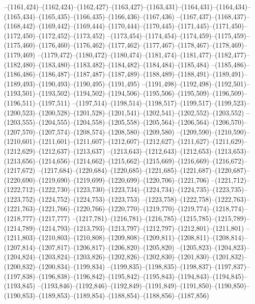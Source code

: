 --(1161,424)--(1162,424)--(1162,427)--(1163,427)--(1163,431)--(1164,431)--(1164,434)--(1165,434)--(1165,435)--(1166,435)--(1166,436)--(1167,436)
--(1167,437)--(1168,437)--(1168,442)--(1169,442)--(1169,444)--(1170,444)--(1170,445)--(1171,445)--(1171,450)--(1172,450)--(1172,452)--(1173,452)
--(1173,454)--(1174,454)--(1174,459)--(1175,459)--(1175,460)--(1176,460)--(1176,462)--(1177,462)--(1177,467)--(1178,467)--(1178,469)--(1179,469)
--(1179,472)--(1180,472)--(1180,474)--(1181,474)--(1181,477)--(1182,477)--(1182,480)--(1183,480)--(1183,482)--(1184,482)--(1184,484)--(1185,484)
--(1185,486)--(1186,486)--(1186,487)--(1187,487)--(1187,489)--(1188,489)--(1188,491)--(1189,491)--(1189,493)--(1190,493)--(1190,495)--(1191,495)
--(1191,498)--(1192,498)--(1192,501)--(1193,501)--(1193,502)--(1194,502)--(1194,506)--(1195,506)--(1195,509)--(1196,509)--(1196,511)--(1197,511)
--(1197,514)--(1198,514)--(1198,517)--(1199,517)--(1199,523)--(1200,523)--(1200,528)--(1201,528)--(1201,541)--(1202,541)--(1202,552)--(1203,552)
--(1203,555)--(1204,555)--(1204,558)--(1205,558)--(1205,564)--(1206,564)--(1206,570)--(1207,570)--(1207,574)--(1208,574)--(1208,580)--(1209,580)
--(1209,590)--(1210,590)--(1210,601)--(1211,601)--(1211,607)--(1212,607)--(1212,627)--(1211,627)--(1211,629)--(1212,629)--(1212,637)--(1213,637)
--(1213,643)--(1212,643)--(1212,653)--(1213,653)--(1213,656)--(1214,656)--(1214,662)--(1215,662)--(1215,669)--(1216,669)--(1216,672)--(1217,672)
--(1217,684)--(1220,684)--(1220,685)--(1221,685)--(1221,687)--(1220,687)--(1220,690)--(1219,690)--(1219,699)--(1220,699)--(1220,706)--(1221,706)
--(1221,712)--(1222,712)--(1222,730)--(1223,730)--(1223,734)--(1224,734)--(1224,735)--(1223,735)--(1223,752)--(1224,752)--(1224,753)--(1223,753)
--(1223,758)--(1222,758)--(1222,763)--(1221,763)--(1221,766)--(1220,766)--(1220,770)--(1219,770)--(1219,774)--(1218,774)--(1218,777)--(1217,777)
--(1217,781)--(1216,781)--(1216,785)--(1215,785)--(1215,789)--(1214,789)--(1214,793)--(1213,793)--(1213,797)--(1212,797)--(1212,801)--(1211,801)
--(1211,803)--(1210,803)--(1210,808)--(1209,808)--(1209,811)--(1208,811)--(1208,814)--(1207,814)--(1207,817)--(1206,817)--(1206,820)--(1205,820)
--(1205,823)--(1204,823)--(1204,824)--(1203,824)--(1203,826)--(1202,826)--(1202,830)--(1201,830)--(1201,832)--(1200,832)--(1200,834)--(1199,834)
--(1199,835)--(1198,835)--(1198,837)--(1197,837)--(1197,838)--(1196,838)--(1196,842)--(1195,842)--(1195,843)--(1194,843)--(1194,845)--(1193,845)
--(1193,846)--(1192,846)--(1192,849)--(1191,849)--(1191,850)--(1190,850)--(1190,853)--(1189,853)--(1189,854)--(1188,854)--(1188,856)--(1187,856)
